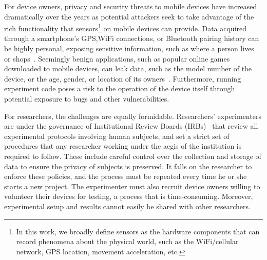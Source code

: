 For device owners, privacy and security threats to mobile devices have
increased dramatically over the years as potential attackers seek
to take advantage of the rich functionality that %
sensors\footnote{\scriptsize In this work, we broadly define sensors
as the hardware components that can record phenomena about the
physical world, such as the WiFi/cellular network, GPS location,
movement acceleration, etc.} on mobile devices can provide.
Data acquired through a smartphone's GPS,WiFi
connections, or Bluetooth pairing history can be highly personal,
exposing sensitive information, such as where a person lives or 
shops~\cite{han2012accomplice}. Seemingly benign applications, 
such as popular online games downloaded to mobile devices, can
leak data, such as the model number of the device, or the age, gender, 
or location of its owners~\cite{AngryBirds}. Furthermore, running experiment code poses 
a risk to the operation of the device itself through potential exposure 
to bugs and other vulnerabilities. 

For researchers, the challenges are equally formidable. 
Researchers' experimenters are under the governance of Institutional 
Review Boards (IRBs)~\cite{irb} that
review all experimental protocols involving human subjects,
and set a strict set of procedures that any researcher working under
the aegis of the institution is required to follow. These include
careful control over the collection and storage of data to ensure the 
privacy of subjects is preserved. It falls on the researcher to enforce 
these policies, and the process must be repeated every time he or 
she starts a new project. The experimenter must also recruit device 
owners willing to volunteer their devices for testing, a process that 
is time-consuming. Moreover, experimental setup and results cannot 
easily be shared with other researchers. 

